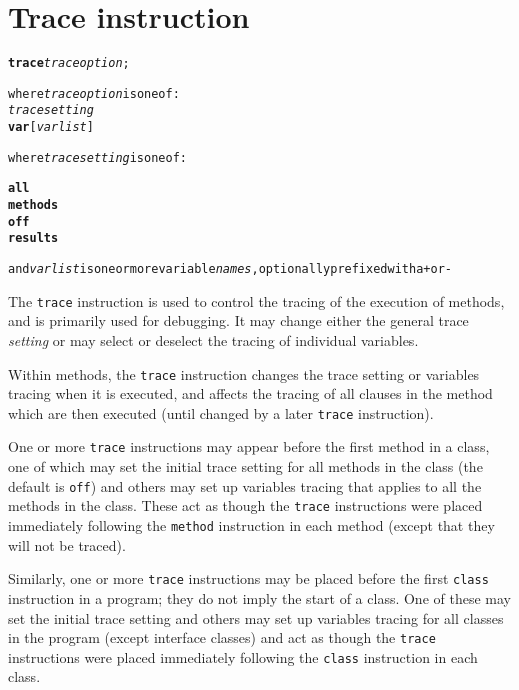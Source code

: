 \chapter{Trace instruction}\label{reftrace}
\index{,}
\index{,}
\begin{shaded}
\begin{alltt}
\textbf{trace} \emph{traceoption};

where \emph{traceoption} is one of:
    \emph{tracesetting}
    \textbf{var} [\emph{varlist}]

where \emph{tracesetting} is one of:

    \textbf{all}
    \textbf{methods}
    \textbf{off}
    \textbf{results}

and \emph{varlist} is one or more variable \emph{names}, optionally prefixed with a \texttt{+} or \texttt{-}
\end{alltt}
\end{shaded}
 The \texttt{trace} instruction is used to control the tracing of the
execution of \nr{} methods, and is primarily used for debugging.
It may change either the general trace \emph{setting} or may select
or deselect the tracing of individual variables.
 
Within methods, the \texttt{trace} instruction changes the trace setting
or variables tracing when it is executed, and affects the tracing of
all clauses in the method which are then executed (until changed by a
later \texttt{trace} instruction).
 
One or more \texttt{trace} instructions may appear before the first
method in a class, one of which may set the initial trace setting
for all methods in the class (the default is \texttt{off}) and others
may set up variables tracing that applies to all the methods in the
class.
These act as though the \texttt{trace} instructions were
placed immediately following the \texttt{method} instruction in each
method (except that they will not be traced).
 
Similarly, one or more \texttt{trace} instructions may be placed
before the first \texttt{class} instruction in a program; they do not
imply the start of a class.  One of these may set the initial trace
setting and others may set up variables tracing for all classes in
the program (except interface classes) and act as though the
\texttt{trace} instructions were placed immediately following the
\texttt{class} instruction in each class.
